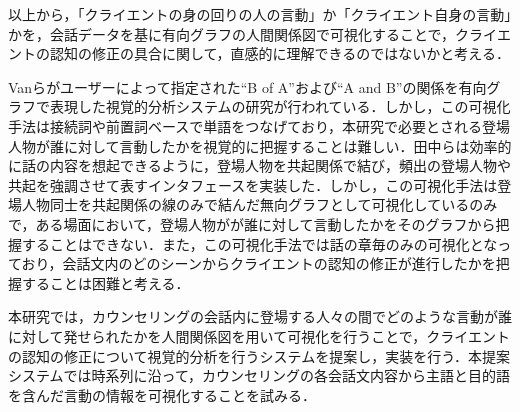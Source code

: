\documentclass[shuuron]{kuee}
\begin{document}
以上から，「クライエントの身の回りの人の言動」か「クライエント自身の言動」かを，会話データを基に有向グラフの人間関係図で可視化することで，クライエントの認知の修正の具合に関して，直感的に理解できるのではないかと考える．

Vanら\cite{van2009mapping}がユーザーによって指定された``B of A''および``A and B''の関係を有向グラフで表現した視覚的分析システムの研究が行われている．しかし，この可視化手法は接続詞や前置詞ベースで単語をつなげており，本研究で必要とされる登場人物が誰に対して言動したかを視覚的に把握することは難しい．田中ら\cite{tanaka}は効率的に話の内容を想起できるように，登場人物を共起関係で結び，頻出の登場人物や共起を強調させて表すインタフェースを実装した．しかし，この可視化手法は登場人物同士を共起関係の線のみで結んだ無向グラフとして可視化しているのみで，ある場面において，登場人物がが誰に対して言動したかをそのグラフから把握することはできない．また，この可視化手法では話の章毎のみの可視化となっており，会話文内のどのシーンからクライエントの認知の修正が進行したかを把握することは困難と考える．

本研究では，カウンセリングの会話内に登場する人々の間でどのような言動が誰に対して発せられたかを人間関係図を用いて可視化を行うことで，クライエントの認知の修正について視覚的分析を行うシステムを提案し，実装を行う．本提案システムでは時系列に沿って，カウンセリングの各会話文内容から主語と目的語を含んだ言動の情報を可視化することを試みる．







%
%
%
%
\end{document}

